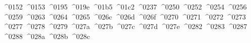 {  ^^^^0152%
  ^^^^0153%
  ^^^^0195%
  ^^^^019e%
  ^^^^01b5%
  ^^^^01c2%
  ^^^^0237%
  ^^^^0250%
  ^^^^0252%
  ^^^^0254%
  ^^^^0256%
  ^^^^0259%
  ^^^^0263%
  ^^^^0264%
  ^^^^0265%
  ^^^^026c%
  ^^^^026d%
  ^^^^026f%
  ^^^^0270%
  ^^^^0271%
  ^^^^0272%
  ^^^^0273%
  ^^^^0277%
  ^^^^0278%
  ^^^^0279%
  ^^^^027a%
  ^^^^027b%
  ^^^^027c%
  ^^^^027d%
  ^^^^027e%
  ^^^^0282%
  ^^^^0283%
  ^^^^0287%
  ^^^^0288%
  ^^^^028a%
  ^^^^028b%
  ^^^^028c%
}
